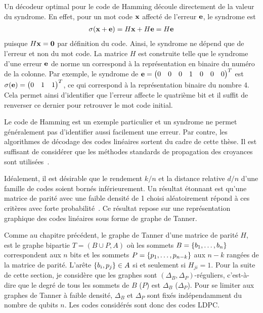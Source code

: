 Un décodeur optimal pour le code de Hamming découle directement de la valeur du syndrome.
En effet, pour un mot code $\vb x$ affecté de l'erreur $\vb e$,
le syndrome est 
\begin{align}
	\sigma(\vb x + \vb e) = H\vb x + H\vb e = H\vb e
\end{align}
puisque $H \vb x = \vb 0$ par définition du code.
Ainsi, le syndrome ne dépend que de l'erreur et non du mot code.
La matrice $H$ est construite telle que le syndrome d'une erreur $\vb e$ de norme un
correspond à la représentation en binaire du numéro de la colonne.
Par exemple,
le syndrome de $\vb e = \begin{pmatrix} 0 & 0 & 0 & 1 & 0 & 0 & 0 \end{pmatrix}^T$
est $\sigma(\vb e) = \begin{pmatrix} 0 & 1 & 1 \end{pmatrix}^T$,
ce qui correspond à la représentation binaire du nombre 4.
Cela permet ainsi d'identifier que l'erreur affecte le quatrième bit et 
il suffit de renverser ce dernier pour retrouver le mot code initial.

Le code de Hamming est un exemple particulier et un syndrome ne permet généralement
pas d'identifier aussi facilement une erreur.
Par contre,
les algorithmes de décodage des codes linéaires sortent du cadre de cette thèse.
Il est suffisant de considérer que les méthodes standards de propagation des 
croyances sont utilisées~\cite{richardson_modern_2008}.

Idéalement,
il est désirable que 
le rendement $k/n$ et la distance relative $d/n$ d'une famille de codes
soient bornés inférieurement.
Un résultat étonnant est qu'une matrice de parité avec une faible densité de 1
choisi aléatoirement répond à ces critères avec forte probabilité~\cite{sipser_expander_1996}.
Ce résultat repose sur une représentation graphique des codes linéaires sous forme de graphe de Tanner.

Comme au chapitre précédent,
le graphe de Tanner d'une matrice de parité $H$,
est le graphe bipartie $T = (B \cup P, A)$
où les sommets $B = \qty{b_1, \ldots, b_n}$ correspondent aux $n$ bits
et les sommets $P = \qty{p_1, \ldots, p_{n - k}}$ aux $n - k$ rangées de la matrice de parité.
L'arête $\qty{b_i, p_j} \in A$ si et seulement si $H_{ji} = 1$.
Pour la suite de cette section,
je considère que les graphes sont $(\Delta_B, \Delta_P)$-réguliers,
c'est-à-dire que le degré de tous les sommets de $B$ ($P$) est $\Delta_B$ ($\Delta_P$).
Pour se limiter aux graphes de Tanner à faible densité,
$\Delta_B$ et $\Delta_P$ sont fixés indépendamment du nombre de qubits $n$.
Les codes considérés sont donc des codes LDPC.

